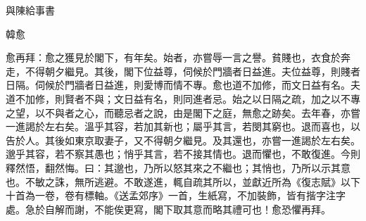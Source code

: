 與陳給事書

韓愈

愈再拜：愈之獲見於閣下，有年矣。始者，亦嘗辱一言之譽。貧賤也，衣食於奔走，不得朝夕繼見。其後，閣下位益尊，伺候於門牆者日益進。夫位益尊，則賤者日隔。伺候於門牆者日益進，則愛博而情不專。愈也道不加修，而文日益有名。夫道不加修，則賢者不與；文日益有名，則同進者忌。始之以日隔之疏，加之以不專之望，以不與者之心，而聽忌者之說，由是閣下之庭，無愈之跡矣。去年春，亦嘗一進謁於左右矣。溫乎其容，若加其新也；屬乎其言，若閔其窮也。退而喜也，以告於人。其後如東京取妻子，又不得朝夕繼見。及其還也，亦嘗一進謁於左右矣。邈乎其容，若不察其愚也；悄乎其言，若不接其情也。退而懼也，不敢復進。今則釋然悟，翻然悔。曰：其邈也，乃所以怒其來之不繼也；其悄也，乃所以示其意也。不敏之誅，無所逃避。不敢遂進，輒自疏其所以，並獻近所為《復志賦》以下十首為一卷，卷有標軸。《送孟郊序》一首，生紙寫，不加裝飾，皆有揩字注字處。急於自解而謝，不能俟更寫，閣下取其意而略其禮可也！愈恐懼再拜。
